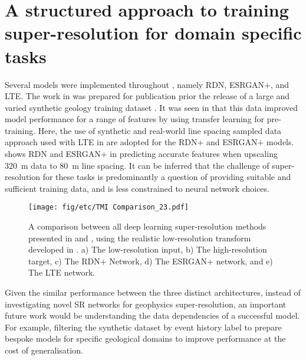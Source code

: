 \section[Super-resolution for domain specific tasks]{A structured approach to training super-resolution for domain specific tasks}
Several models were implemented throughout , namely RDN, ESRGAN+, and LTE\@.
The work in  was prepared for publication prior the release of a large and varied synthetic geology training dataset \parencite{jessellNoddyverseMassiveData2022}.
It was seen in  that this data improved model performance for a range of features by using transfer learning for pre-training.
Here, the use of synthetic and real-world line spacing sampled data approach used with LTE in  are adopted for the RDN+ and ESRGAN+ models.
 shows RDN and ESRGAN+ in predicting accurate features when upscaling \qty{320}{\m} data to \qty{80}{\m} line spacing.
It can be inferred that the challenge of super-resolution for these tasks is predominantly a question of providing suitable and sufficient training data, and is less constrained to neural network choices.

\begin{figure}
    \texttt{[image: fig/etc/TMI Comparison\_23.pdf]} %
    \caption{
        A comparison between all deep learning super-resolution methods presented in  and , using the realistic low-resolution transform developed in .
        a) The low-resolution input, b) The high-resolution target, c) The RDN+ Network, d) The ESRGAN+ network, and e) The LTE network.}
    \label{fig:modcomp}
\end{figure}

Given the similar performance between the three distinct architectures, instead of investigating novel SR networks for geophysics super-resolution, an important future work would be understanding the data dependencies of a successful model. For example, filtering the synthetic dataset by event history label to prepare bespoke models for specific geological domains to improve performance at the cost of generalisation.

